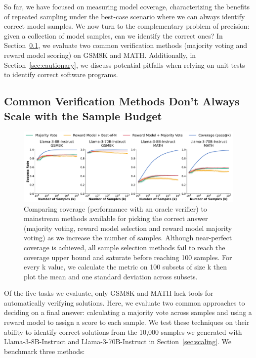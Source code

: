 \documentclass[11pt]{article}
\begin{document}
So far, we have focused on measuring model coverage, characterizing the benefits of repeated sampling under the best-case scenario where we can always identify correct model samples. We now turn to the complementary problem of precision: given a collection of model samples, can we identify the correct ones? In Section~\ref{sec:identification}, we evaluate two common verification methods (majority voting and reward model scoring) on GSM8K and MATH. Additionally, in Section~\ref{sec:cautionary}, we discuss potential pitfalls when relying on unit tests to identify correct software programs.

\subsection{Common Verification Methods Don't Always Scale with the Sample Budget}

\label{sec:identification}


\begin{figure}
    \centering
    \includegraphics[width=\textwidth]{figures/pass_ats.pdf}
    \caption{Comparing coverage (performance with an oracle verifier) to mainstream methods available for picking the correct answer (majority voting, reward model selection and reward model majority voting) as we increase the number of samples. Although near-perfect coverage is achieved, all sample selection methods fail to reach the coverage upper bound and saturate before reaching 100 samples. For every k value, we calculate the metric on 100 subsets of size k then plot the mean and one standard deviation across subsets.}
    \label{fig:precision_methods}
\end{figure}

Of the five tasks we evaluate, only GSM8K and MATH lack tools for automatically verifying solutions. Here, we evaluate two common approaches to deciding on a final answer: calculating a majority vote across samples and using a reward model to assign a score to each sample. We test these techniques on their ability to identify correct solutions from the 10,000 samples we generated with Llama-3-8B-Instruct and Llama-3-70B-Instruct in Section~\ref{sec:scaling}. We benchmark three methods:
\end{document}
